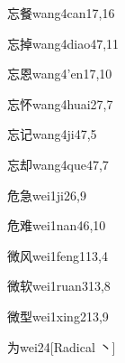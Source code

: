 \begin{verbete}{忘餐}{wang4can1}{7,16}
\end{verbete}

\begin{verbete}{忘掉}{wang4diao4}{7,11}
\end{verbete}

\begin{verbete}{忘恩}{wang4'en1}{7,10}
\end{verbete}

\begin{verbete}{忘怀}{wang4huai2}{7,7}
\end{verbete}

\begin{verbete}{忘记}{wang4ji4}{7,5}
\end{verbete}

\begin{verbete}{忘却}{wang4que4}{7,7}
\end{verbete}

\begin{verbete}{危急}{wei1ji2}{6,9}
\end{verbete}

\begin{verbete}{危难}{wei1nan4}{6,10}
\end{verbete}

\begin{verbete}{微风}{wei1feng1}{13,4}
\end{verbete}

\begin{verbete}{微软}{wei1ruan3}{13,8}
\end{verbete}

\begin{verbete}{微型}{wei1xing2}{13,9}
\end{verbete}

\begin{verbete}{为}{wei2}{4}[Radical 丶]
\end{verbete}

